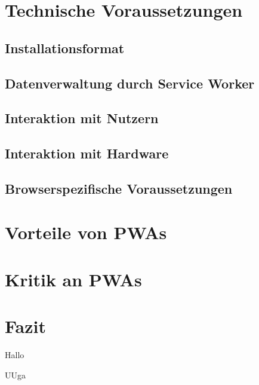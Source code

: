 \documentclass[11pt, parskip=half]{scrartcl}       %
\begin{document}
\section{Technische Voraussetzungen}

\subsection{Installationsformat}

\subsection{Datenverwaltung durch Service Worker}

\subsection{Interaktion mit Nutzern}

\subsection{Interaktion mit Hardware}

\subsection{Browserspezifische Voraussetzungen}


\section{Vorteile von PWAs}

\section{Kritik an PWAs}


\section{Fazit}

Hallo~\cite{test_online}

\newpage
UUga
\printbibliography
\end{document}
